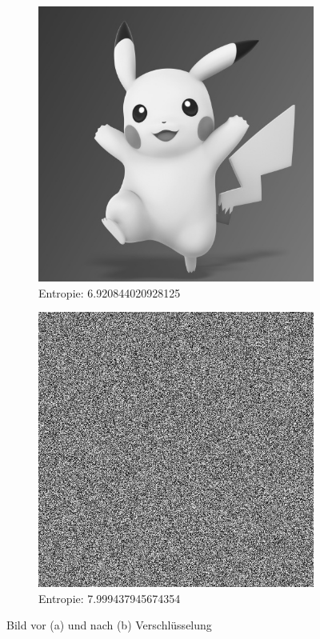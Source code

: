 \begin{figure}
	\centering

	\begin{subfigure}{0.35\textwidth}
		\includegraphics[width=\textwidth]{../1/3/gray_6.920844020928125_pikachu.jpg}
		\caption{Entropie: 6.920844020928125}
	\end{subfigure}
	\hfill
	\begin{subfigure}{0.35\textwidth}
		\includegraphics[width=\textwidth]{../1/3/encrypted_7.999437945674354_pikachu.jpg}
		\caption{Entropie: 7.999437945674354}
	\end{subfigure}

	\caption{Bild vor (a) und nach (b) Verschlüsselung}
	\label{fig:pika}
\end{figure}

